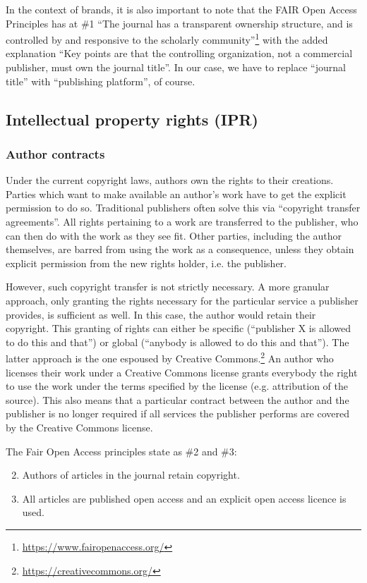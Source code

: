 \documentclass[nonflat,modfonts,output=book] {langsci/langscibook}
\newcommand{\footurl}[1]{\footnote{\url{#1}}}
\begin{document}
In the context of brands, it is also important to note that the FAIR Open Access Principles has at \#1 ``The journal has a transparent ownership structure, and is controlled by and responsive to the scholarly community''\footurl{https://www.fairopenaccess.org/} with the added explanation 
``Key points are that the controlling organization, not a commercial publisher, must own the journal title''. In our case, 
we have to replace ``journal title'' with ``publishing platform'', of course. 
 
\subsection{Intellectual property rights (IPR)}
\subsubsection{Author contracts}\label{sec:authorcontract}
Under the current copyright laws, authors own the rights to their creations. Parties which want to make available an author's work have to get the explicit permission to do so. Traditional publishers often solve this via ``copyright transfer agreements''. All rights pertaining to a work are transferred to the publisher, who can then do with the work as they see fit. Other parties, including the author themselves, are barred from using the work as a consequence, unless they obtain explicit permission from the new rights holder, i.e. the publisher. 

However, such copyright transfer is not strictly necessary. A more granular approach, only granting the rights necessary for the particular service a publisher provides, is sufficient as well. In this case, the author would retain their copyright. This granting of rights can either be specific (``publisher X is allowed to do this and that'') or global (``anybody is allowed to do this and that''). The latter approach is the one espoused by Creative Commons.\footurl{https://creativecommons.org/} An author who licenses their work under a Creative Commons license grants everybody the right to use the work under the terms specified by the license (e.g. attribution of the source). This also means that a particular contract between the author and the publisher is no longer required if all services the publisher performs are covered by the Creative Commons license. 

The Fair Open Access principles state as \#2 and \#3:

\begin{enumerate}
\setcounter{enumi}{1}
\item Authors of articles in the journal retain copyright.
\item All articles are published open access and an explicit open access licence is used.
\end{enumerate}
\end{document}
